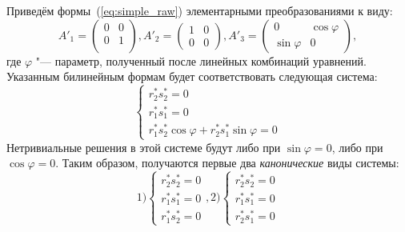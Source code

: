 Приведём формы~(\ref{eq:simple_raw}) элементарными преобразованиями к виду: 
\begin{equation}
	A'_1 = 
	\begin{pmatrix}
		0 & 0 \\
		0 & 1 \\
	\end{pmatrix}, 
	A'_2 = 
	\begin{pmatrix}
		1 & 0 \\
		0 & 0
 	\end{pmatrix},
	A'_3 = 
	\begin{pmatrix}
		0 & \cos \varphi \\
		\sin \varphi & 0
	\end{pmatrix},
\end{equation}
где $\varphi$ "--- параметр, полученный после линейных комбинаций уравнений.
Указанным билинейным формам будет соответствовать следующая система: 
\begin{equation}
	\begin{cases}
		r^*_2 s^*_2 = 0 \\ 
		r^*_1 s^*_1 = 0 \\
		r^*_1 s^*_2 \cos \varphi + r^*_2 s^*_1 \sin \varphi = 0
	\end{cases}
\end{equation} 
Нетривиальные решения в этой системе будут либо при $\sin \varphi = 0$, либо при $\cos 
\varphi = 0$. Таким образом, получаются первые два \textit{канонические} виды системы:
\begin{equation}
1)
	\begin{cases} 
		r^*_2 s^*_2 = 0 \\ 
		r^*_1 s^*_1 = 0 \\
		r^*_1 s^*_2 = 0
	\end{cases},
2)
	\begin{cases} 
		r^*_2 s^*_2 = 0 \\ 
		r^*_1 s^*_1 = 0 \\
		r^*_2 s^*_1 = 0
	\end{cases}
\end{equation}

